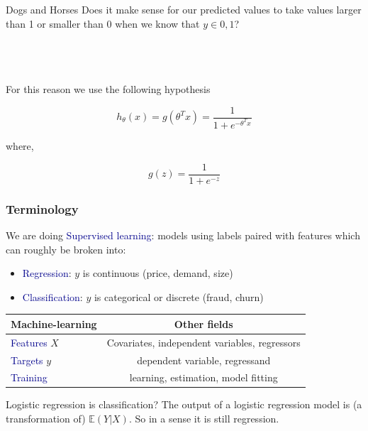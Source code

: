 \documentclass[table,dvipsnames]{beamer}
\newcommand{\highlt}{\textcolor{darkblue}}
\begin{document}
\begin{frame}
\scriptsize

\begin{block}{Dogs and Horses}
Does it make sense for our predicted values to take values larger than 1 or smaller than 0 when we know that $y \in {0, 1}$?
\end{block}
\ \\ \ \\ \ \\
\noindent For this reason we use the following hypothesis

\begin{equation}
 h_{\theta}(x) = g(\theta^{T} x) = \frac{1}{1 + e^{-\theta^{T}x}}
\end{equation}

where,

\begin{equation}
g(z) = \frac{1}{1+e^{-z}}
\end{equation}

\end{frame}

\begin{frame}
\frametitle{Terminology}
\scriptsize
We are doing \highlt{Supervised learning}: models using labels paired with features which can roughly be broken into:

\begin{itemize}
 \item \highlt{Regression}: $y$ is continuous (price, demand, size)
 \item \highlt{Classification}: $y$ is categorical or discrete (fraud, churn)
\end{itemize}

\begin{table}
\begin{tabular}{|l|c|}
\hline
Machine-learning  &  Other fields \\
\hline        
\highlt{Features} $X$  & Covariates, independent variables, regressors \\
\highlt{Targets}  $y$  & dependent variable, regressand                \\
\highlt{Training}      & learning, estimation, model fitting           \\
\hline
\end{tabular}
\end{table}

\begin{block}{Logistic regression is classification?}
 The output of a logistic regression model is (a transformation of) $𝔼(Y|X)$.  So in a sense it is still regression.
\end{block}

\end{frame}
\end{document}
